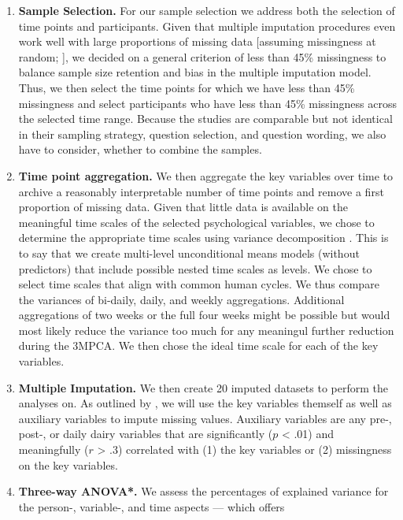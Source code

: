 \documentclass[]{article}
\providecommand{\tightlist}{%
\setlength{\itemsep}{0pt}\setlength{\parskip}{0pt}}
\newcounter{question}
\begin{document}
\begin{enumerate}
\def\labelenumi{\arabic{enumi}.}
\tightlist
\item
  \textbf{Sample Selection.} For our sample selection we address both
  the selection of time points and participants. Given that multiple
  imputation procedures even work well with large proportions of missing
  data {[}assuming missingness at random; \citet{Madley-Dowd2019}{]}, we
  decided on a general criterion of less than 45\% missingness to
  balance sample size retention and bias in the multiple imputation
  model. Thus, we then select the time points for which we have less
  than 45\% missingness and select participants who have less than 45\%
  missingness across the selected time range. Because the studies are
  comparable but not identical in their sampling strategy, question
  selection, and question wording, we also have to consider, whether to
  combine the samples.
\item
  \textbf{Time point aggregation.} We then aggregate the key variables
  over time to archive a reasonably interpretable number of time points
  and remove a first proportion of missing data. Given that little data
  is available on the meaningful time scales of the selected
  psychological variables, we chose to determine the appropriate time
  scales using variance decomposition \citep[e.g., see][]{Ram2014}. This
  is to say that we create multi-level unconditional means models
  (without predictors) that include possible nested time scales as
  levels. We chose to select time scales that align with common human
  cycles. We thus compare the variances of bi-daily, daily, and weekly
  aggregations. Additional aggregations of two weeks or the full four
  weeks might be possible but would most likely reduce the variance too
  much for any meaningul further reduction during the 3MPCA. We then
  chose the ideal time scale for each of the key variables.
\item
  \textbf{Multiple Imputation.} We then create 20 imputed datasets to
  perform the analyses on. As outlined by \citet{Monden2015}, we will
  use the key variables themself as well as auxiliary variables to
  impute missing values. Auxiliary variables are any pre-, post-, or
  daily dairy variables that are significantly (\(p\) \textless{} .01)
  and meaningfully (\(r\) \textgreater{} .3) correlated with (1) the key
  variables or (2) missingness on the key variables.
\item
  \textbf{Three-way ANOVA*.} We assess the percentages of explained
  variance for the person-, variable-, and time aspects --- which offers

\end{enumerate}
\end{document}
